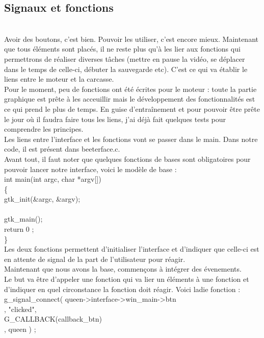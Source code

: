 \documentclass[11pt,french,a4paper]{report}
\begin{document}
        \subsection{Signaux et fonctions} \\
Avoir des boutons, c'est bien. Pouvoir les utiliser, c'est encore mieux. Maintenant que tous éléments sont placés, 
il ne reste plus qu'à les lier aux fonctions qui permettrons de réaliser diverses tâches (mettre en pause la vidéo,
se déplacer dans le temps de celle-ci, débuter la sauvegarde etc).  C'est ce qui va établir le liens entre le moteur et la carcasse. \\
Pour le moment, peu de fonctions ont été écrites pour le moteur : toute la partie graphique est prête à les acceuillir 
mais le développement des fonctionnalités est ce qui prend le plus de temps. En guise d'entraînement et pour 
pouvoir être prête le jour où il faudra faire tous les liens, j'ai déjà fait quelques tests pour comprendre les principes. \\
Les liens entre l'interface et les fonctions vont se passer dans le main. Dans notre code, il est présent dans beeterface.c.\\
Avant tout, il faut noter que quelques fonctions de bases sont obligatoires pour pouvoir lancer notre interface, voici 
le modèle de base : \\
int main(int argc, char *argv[])    \\ 
\{ \\
 gtk\_init(&argc, &argv); \\
 [votre code] \\
 gtk\_main(); \\
 return 0 ; \\
\} \\
Les deux fonctions permettent d'initialiser l'interface et d'indiquer que celle-ci est en attente de signal
de la part de l'utilisateur pour réagir. \\
Maintenant que nous avons la base, commençons à intégrer des évenements. \\
Le but va être d'appeler une fonction qui va lier un éléments à une fonction et d'indiquer en quel circonstance 
la fonction doit réagir. Voici ladie fonction : \\
g\_signal\_connect( queen->interface->win\_main->btn \\,
                   "clicked", \\
                    G\_CALLBACK(callback\_btn) \\,
                    queen ) ; \\
\end{document}
